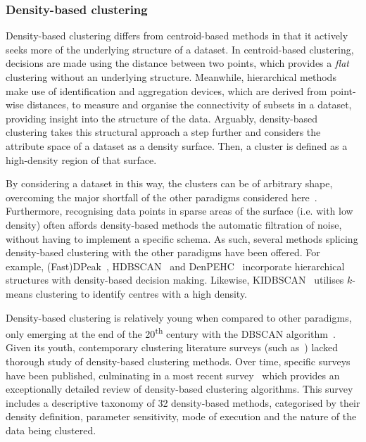 \subsubsection{Density-based clustering}

Density-based clustering differs from centroid-based methods in that
it actively seeks more of the underlying structure of a dataset. In
centroid-based clustering, decisions are made using the distance between two
points, which provides a \emph{flat} clustering without an underlying structure.
Meanwhile, hierarchical methods make use of identification and aggregation
devices, which are derived from point-wise distances, to measure and organise
the connectivity of subsets in a dataset, providing insight into the structure
of the data. Arguably, density-based clustering takes this structural approach a
step further and considers the attribute space of a dataset as a density
surface. Then, a cluster is defined as a high-density region of that surface.

By considering a dataset in this way, the clusters can be of arbitrary shape,
overcoming the major shortfall of the other paradigms considered
here~\cite{Raykov2016}. Furthermore, recognising data points in sparse areas of
the surface (i.e. with low density) often affords density-based methods the
automatic filtration of noise, without having to implement a specific schema. As
such, several methods splicing density-based clustering with the other paradigms
have been offered. For example, (Fast)DPeak~\cite{Chen2020},
HDBSCAN~\cite{Campello2013} and DenPEHC~\cite{Xu2016} incorporate hierarchical
structures with density-based decision making. Likewise,
KIDBSCAN~\cite{Tsai2006} utilises \(k\)-means clustering to identify centres
with a high density.

Density-based clustering is relatively young when compared to other paradigms,
only emerging at the end of the 20\textsuperscript{th} century with the DBSCAN
algorithm~\cite{Ester1996}. Given its youth, contemporary clustering literature
surveys (such as~\cite{Jain1999,Xu2005}) lacked thorough study of density-based
clustering methods. Over time, specific surveys have been published, culminating
in a most recent survey~\cite{Bhattacharjee2020} which provides an exceptionally
detailed review of density-based clustering algorithms. This survey includes a
descriptive taxonomy of 32 density-based methods, categorised by their density
definition, parameter sensitivity, mode of execution and the nature of the data
being clustered.

